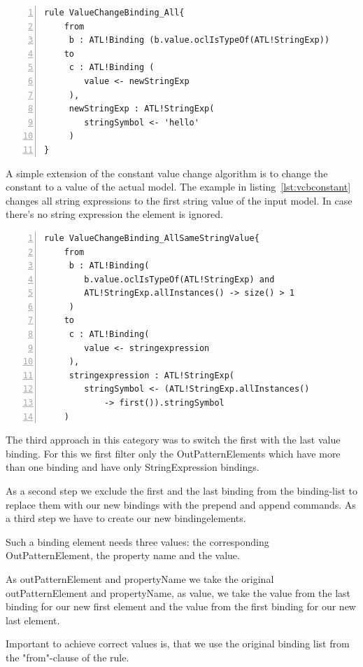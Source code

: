 \documentclass{llncs}
\begin{document}
\begin{lstlisting}[language=ATL, numbers=left,xleftmargin=5.0ex, caption=ValueChangeBinding-Definition., label=lst:valuechangebinding1]
rule ValueChangeBinding_All{
	from
	 b : ATL!Binding (b.value.oclIsTypeOf(ATL!StringExp))
	to
	 c : ATL!Binding (
	 	value <- newStringExp
	 ),
	 newStringExp : ATL!StringExp(
	 	stringSymbol <- 'hello'	
	 )
}
\end{lstlisting}

A simple extension of the constant value change algorithm is to change the constant to a value of the actual model. The example in listing~\ref{lst:vcbconstant} changes all string expressions to the first string value of the input model. In case there's no string expression the element is ignored.

\begin{lstlisting}[language=ATL, numbers=left,xleftmargin=5.0ex, caption=ValueChangeBinding-Definition using same constant string value., label=lst:vcbconstant]
rule ValueChangeBinding_AllSameStringValue{
	from
	 b : ATL!Binding(
	 	b.value.oclIsTypeOf(ATL!StringExp) and 
		ATL!StringExp.allInstances() -> size() > 1
	 )
	to
	 c : ATL!Binding(
	 	value <- stringexpression
	 ), 
	 stringexpression : ATL!StringExp(
	 	stringSymbol <- (ATL!StringExp.allInstances() 
			-> first()).stringSymbol
	)
\end{lstlisting}

The third approach in this category was to switch the first with the last value binding. For this we first filter only the OutPatternElements which have more than one binding and have only StringExpression bindings.

As a second step we exclude the first and the last binding from the binding-list to replace them with our new bindings with the prepend and append commands. As a third step we have to create our new bindingelements.

Such a binding element needs three values: the corresponding OutPatternElement, the property name and the value.

As outPatternElement and propertyName we take the original outPatternElement and propertyName, as value, we take the value from the last binding for our new first element and the value from the first binding for our new last element.

Important to achieve correct values is, that we use the original binding list from the "from"-clause of the rule.
\end{document}
